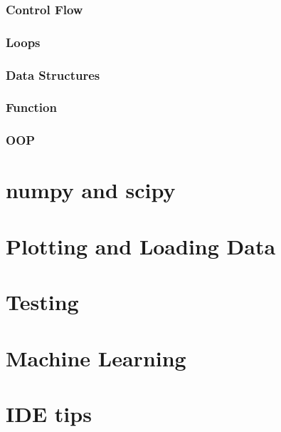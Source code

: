 \documentclass{article}
\begin{document}
\section{Control Flow}
\section{Loops}
\section{Data Structures}
\section{Function}
\section{OOP}

\part{numpy and scipy}
\part{Plotting and Loading Data}
\part{Testing}
\part{Machine Learning}
\part{IDE tips}
\end{document}
